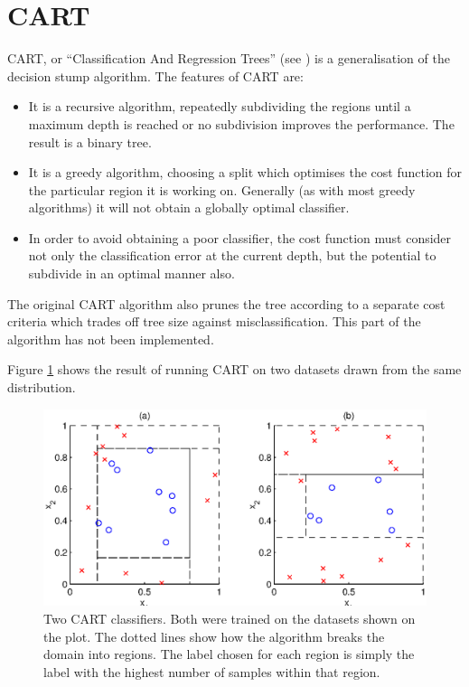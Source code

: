 \section{CART}

CART, or ``Classification And Regression Trees'' (see
\cite{Cherkassky98}) is a generalisation of the decision stump
algorithm.  The features of CART are:
%
\begin{itemize}
\item	It is a recursive algorithm, repeatedly subdividing the
	regions until a maximum depth is reached or no subdivision
	improves the performance.  The result is a binary tree.

\item	It is a greedy algorithm, choosing a split which optimises the
	cost function for the particular region it is working on.
	Generally (as with most greedy algorithms) it will not obtain a
	globally optimal classifier.

\item	In order to avoid obtaining a poor classifier, the cost
	function must consider not only the classification error at
	the current depth, but the potential to subdivide in an
	optimal manner also.
\end{itemize}

The original CART algorithm also prunes the tree according to a
separate cost criteria which trades off tree size against
misclassification.  This part of the algorithm has not been
implemented.

Figure \ref{fig:cart} shows the result of running CART on two datasets
drawn from the same distribution.

\begin{figure}
\begin{center}
\includegraphics{figures/cartdiagram.eps}
\end{center}
\caption{Two CART classifiers.  Both were trained on the
datasets shown on the plot.  The dotted lines show how the algorithm
breaks the domain into regions.  The label chosen for each region is
simply the label with the highest number of samples within that region.}
\label{fig:cart}
\end{figure}
